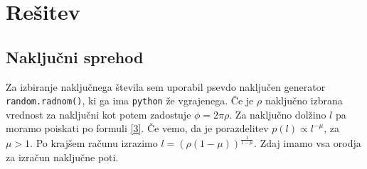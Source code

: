 \section{Rešitev}
\subsection{Naključni sprehod}
Za izbiranje naključnega števila sem uporabil psevdo naključen generator \verb|random.radnom()|,
ki ga ima \verb|python| že vgrajenega. Če je $\rho$ naključno izbrana vrednost
za naključni kot potem zadostuje $\phi = 2\pi\rho$.
Za naključno dolžino $l$ pa moramo poiskati po formuli \eqref{3}. Če vemo,
da je porazdelitev $p(l) \propto l^{-\mu}$, za $\mu > 1$. Po krajšem računu
izrazimo $l = \left(\rho\left(1-\mu\right)\right)^{\frac{1}{1-\mu}}$.
Zdaj imamo vsa orodja za izračun naključne poti.


